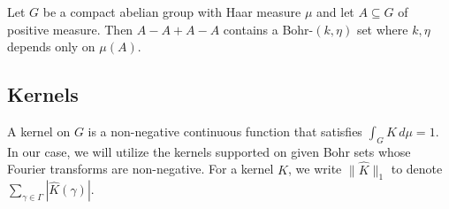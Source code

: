 \begin{lemma}
\label{lem:bogolyubov_compact_group}
Let $G$ be a compact abelian group with Haar measure $\mu$ and let $A \subseteq G$ of positive measure. Then $A - A + A - A$ contains a Bohr-$(k, \eta)$ set where $k, \eta$ depends only on $\mu(A)$.
\end{lemma}

\subsection{Kernels}
A kernel on $G$ is a non-negative continuous function that satisfies $\int_G K \, d\mu =1$. In our case, we will utilize the kernels supported on given Bohr sets whose Fourier transforms are non-negative. For a kernel $K$, we write $\lVert \widehat{K} \rVert_1$ to denote $\sum_{\gamma \in \Gamma} | \widehat{K}(\gamma)|$.  

